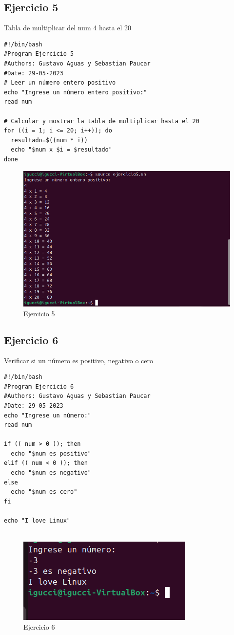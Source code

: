\documentclass[11pt,twoside]{book}
\begin{document}
\newpage
\subsection{Ejercicio 5}

Tabla de multiplicar del num 4 hasta el  20
\begin{lstlisting}
#!/bin/bash
#Program Ejercicio 5
#Authors: Gustavo Aguas y Sebastian Paucar
#Date: 29-05-2023
# Leer un número entero positivo
echo "Ingrese un número entero positivo:"
read num

# Calcular y mostrar la tabla de multiplicar hasta el 20
for ((i = 1; i <= 20; i++)); do
  resultado=$((num * i))
  echo "$num x $i = $resultado"
done

\end{lstlisting}
\begin{figure}[h]
    \centering
    \includegraphics[width=0.5\linewidth]{Ej5.png}
    \caption{Ejercicio 5}

\end{figure}
\newpage
\subsection{Ejercicio 6}
Verificar si un número es positivo, negativo o cero

\begin{lstlisting}
#!/bin/bash
#Program Ejercicio 6
#Authors: Gustavo Aguas y Sebastian Paucar
#Date: 29-05-2023
echo "Ingrese un número:"
read num

if (( num > 0 )); then
  echo "$num es positivo"
elif (( num < 0 )); then
  echo "$num es negativo"
else
  echo "$num es cero"
fi

echo "I love Linux"


\end{lstlisting}
\begin{figure}[h]
    \centering
    \includegraphics[width=0.5\linewidth]{image.png}
    \caption{Ejercicio 6}
\end{figure}
\newpage
\end{document}
